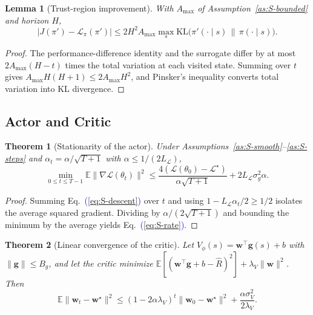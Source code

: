 \documentclass[conference]{IEEEtran}
\newtheorem{lemma}{Lemma}
\newtheorem{theorem}{Theorem}
\theoremstyle{remark}
\newcommand{\Eqref}[1]{\textcolor{blue}{(\ref{#1})}}
\newcommand{\cL}{\mathcal{L}}
\begin{document}
\begin{lemma}[Trust-region improvement]
\label{lem:S-tr}
With $A_{\max}$ of Assumption~\ref{as:S-bounded} and horizon $H$,
\begin{equation}
\big|J(\pi')-\cL_\pi(\pi')\big|\le2H^2A_{\max}\max_{s}\mathrm{KL}\big(\pi'(\cdot\mid s)\,\|\,\pi(\cdot\mid s)\big).
\label{eq:S-tr}
\end{equation}
\end{lemma}

\begin{proof}
The performance-difference identity and the surrogate differ by at most $2A_{\max}(H-t)$ times the total variation at each visited state. Summing over $t$ gives $A_{\max}H(H+1)\le2A_{\max}H^2$, and Pinsker's inequality converts total variation into KL divergence.
\end{proof}

\subsection{Actor and Critic}
\label{sec:S-actor}

\begin{theorem}[Stationarity of the actor]
\label{thm:S-actor}
Under Assumptions~\ref{as:S-smooth}--\ref{as:S-steps} and $\alpha_t=\alpha/\sqrt{T+1}$ with $\alpha\le1/(2L_{\cL})$,
\begin{equation}
\min_{0\le t\le T-1}\mathbb{E}\|\nabla\cL(\theta_t)\|^2\le\frac{4(\cL(\theta_0)-\cL^{\star})}{\alpha\sqrt{T+1}}+2L_{\cL}\sigma_g^2\alpha.
\label{eq:S-rate}
\end{equation}
\end{theorem}

\begin{proof}
Summing Eq.~\Eqref{eq:S-descent} over $t$ and using $1-L_{\cL}\alpha_t/2\ge1/2$ isolates the average squared gradient. Dividing by $\alpha/(2\sqrt{T+1})$ and bounding the minimum by the average yields Eq.~\Eqref{eq:S-rate}.
\end{proof}

\begin{theorem}[Linear convergence of the critic]
\label{thm:S-critic}
Let $V_\phi(s)=\bm{w}^{\top}\bm{g}(s)+b$ with $\|\bm{g}\|\le B_g$, and let the critic minimize $\mathbb{E}[(\bm{w}^{\top}\bm{g}+b-\hat{R})^2]+\lambda_V\|\bm{w}\|^2$. Then
\begin{equation}
\mathbb{E}\|\bm{w}_t-\bm{w}^{\star}\|^2\le(1-2\alpha\lambda_V)^t\|\bm{w}_0-\bm{w}^{\star}\|^2+\frac{\alpha\sigma_V^2}{2\lambda_V}.
\label{eq:S-critic}
\end{equation}
\end{theorem}
\end{document}
